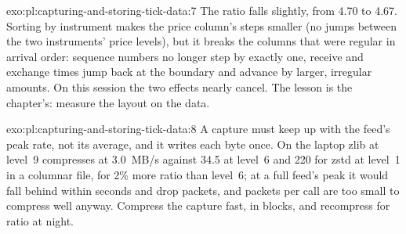 \begin{solution}{exo:pl:capturing-and-storing-tick-data:7}
The ratio falls slightly, from 4.70 to 4.67. Sorting by instrument makes the price column's steps smaller (no jumps between the
two instruments' price levels), but it breaks the columns that were regular in arrival order: sequence numbers no longer step by
exactly one, receive and exchange times jump back at the boundary and advance by larger, irregular amounts. On this session the
two effects nearly cancel. The lesson is the chapter's: measure the layout on the data.
\end{solution}

\begin{solution}{exo:pl:capturing-and-storing-tick-data:8}
A capture must keep up with the feed's peak rate, not its average, and it writes each byte once. On the laptop zlib at level~9
compresses at 3.0~MB/s against 34.5 at level~6 and 220 for zstd at level~1 in a columnar file, for 2\% more ratio than level~6;
at a full feed's peak it would fall behind within seconds and drop packets, and packets per call are too small to compress well
anyway. Compress the capture fast, in blocks, and recompress for ratio at night.
\end{solution}

